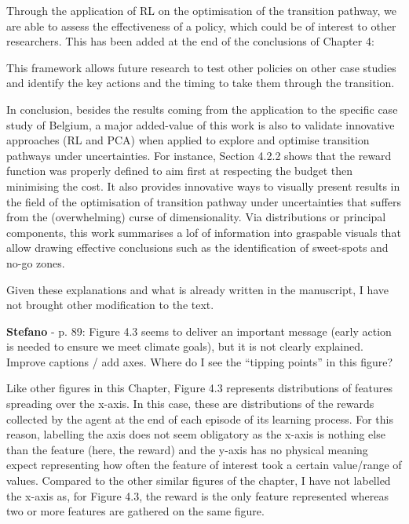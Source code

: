 \documentclass[12pt,a4paper]{article}
\begin{document}
Through the application of RL on the optimisation of the transition pathway, we are able to assess the effectiveness of a policy, which could be of interest to other researchers. This has been added {\color{blue}at the end of the conclusions of Chapter 4}:

\begin{mdframed}[style=manuscript] 
This framework allows future research to test other policies on other case studies and identify the key actions and the timing to take them through the transition.
\end{mdframed}

In conclusion, besides the results coming from the application to the specific case study of Belgium, a major added-value of this work is also to validate innovative approaches (RL and PCA) when applied to explore and optimise transition pathways under uncertainties. For instance, Section 4.2.2 shows that the reward function was properly defined to aim first at respecting the  budget then minimising the cost. It also provides innovative ways to visually present results in the field of the optimisation of transition pathway under uncertainties that suffers from the (overwhelming) curse of dimensionality. Via distributions or principal components, this work summarises a lof of information into graspable visuals that allow drawing effective conclusions such as the identification of sweet-spots and no-go zones.

Given these explanations and what is already written in the manuscript, I have not brought other modification to the text.

\begin{mdframed}[style=comment] %
{\color{orange} \textbf{Stefano}} - p. 89: Figure 4.3 seems to deliver an important message (early action is needed to ensure we meet climate goals), but it is not clearly explained. Improve captions / add axes. 	Where do I see the ``tipping points'' in this figure?
\end{mdframed}

\noindent Like other figures in this Chapter, Figure 4.3 represents distributions of features spreading over the x-axis. In this case, these are distributions of the rewards collected by the agent at the end of each episode of its learning process. For this reason, labelling the axis does not seem obligatory as the x-axis is nothing else than the feature (here, the reward) and the y-axis has no physical meaning expect representing how often the feature of interest took a certain value/range of values. Compared to the other similar figures of the chapter, I have not labelled the x-axis as, for Figure 4.3, the reward is the only feature represented whereas two or more features are gathered on the same figure.
\end{document}
